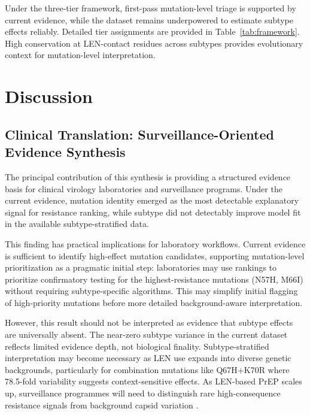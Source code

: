 \documentclass[12pt,a4paper]{article}
\begin{document}
Under the three-tier framework, first-pass mutation-level triage is supported by current evidence, while the dataset remains underpowered to estimate subtype effects reliably. Detailed tier assignments are provided in Table~\ref{tab:framework}. High conservation at LEN-contact residues across subtypes provides evolutionary context for mutation-level interpretation.



\section{Discussion}

\subsection{Clinical Translation: Surveillance-Oriented Evidence Synthesis}

The principal contribution of this synthesis is providing a structured evidence basis for clinical virology laboratories and surveillance programs. Under the current evidence, mutation identity emerged as the most detectable explanatory signal for resistance ranking, while subtype did not detectably improve model fit in the available subtype-stratified data.

This finding has practical implications for laboratory workflows. Current evidence is sufficient to identify high-effect mutation candidates, supporting mutation-level prioritization as a pragmatic initial step: laboratories may use rankings to prioritize confirmatory testing for the highest-resistance mutations (N57H, M66I) without requiring subtype-specific algorithms. This may simplify initial flagging of high-priority mutations before more detailed background-aware interpretation.

However, this result should not be interpreted as evidence that subtype effects are universally absent. The near-zero subtype variance in the current dataset reflects limited evidence depth, not biological finality. Subtype-stratified interpretation may become necessary as LEN use expands into diverse genetic backgrounds, particularly for combination mutations like Q67H+K70R where 78.5-fold variability suggests context-sensitive effects. As LEN-based PrEP scales up, surveillance programmes will need to distinguish rare high-consequence resistance signals from background capsid variation \cite{LancetHIV2025}.
\end{document}

